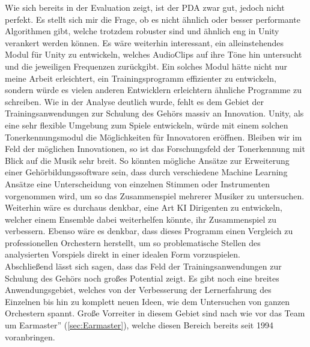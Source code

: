 Wie sich bereits in der Evaluation zeigt, ist der PDA zwar gut, jedoch nicht perfekt. Es stellt sich mir die Frage, ob es nicht ähnlich oder besser performante Algorithmen gibt, welche trotzdem robuster sind und ähnlich eng in Unity verankert werden können. Es wäre weiterhin interessant, ein alleinstehendes Modul für Unity zu entwickeln, welches AudioClips auf ihre Töne hin untersucht und die jeweiligen Frequenzen zurückgibt. Ein solches Modul hätte nicht nur meine Arbeit erleichtert, ein Trainingsprogramm effizienter zu entwickeln, sondern würde es vielen anderen Entwicklern erleichtern ähnliche Programme zu schreiben. Wie in der Analyse deutlich wurde, fehlt es dem Gebiet der Trainingsanwendungen zur Schulung des Gehörs massiv an Innovation. Unity, als eine sehr flexible Umgebung zum Spiele entwickeln, würde mit einem solchen Tonerkennungsmodul die Möglichkeiten für Innovatoren eröffnen. Bleiben wir im Feld der möglichen Innovationen, so ist das Forschungsfeld der Tonerkennung mit Blick auf die Musik sehr breit. So könnten mögliche Ansätze zur Erweiterung einer Gehörbildungssoftware sein, dass durch verschiedene Machine Learning Ansätze eine Unterscheidung von einzelnen Stimmen oder Instrumenten vorgenommen wird, um so das Zusammenspiel mehrerer Musiker zu untersuchen. Weiterhin wäre es durchaus denkbar, eine Art KI Dirigenten zu entwickeln, welcher einem Ensemble dabei weiterhelfen könnte, ihr Zusammenspiel zu verbessern. Ebenso wäre es denkbar, dass dieses Programm einen Vergleich zu professionellen Orchestern herstellt, um so problematische Stellen des analysierten Vorspiels direkt in einer idealen Form vorzuspielen. \\
Abschließend lässt sich sagen, dass das Feld der Trainingsanwendungen zur Schulung des Gehörs noch großes Potential zeigt. Es gibt noch eine breites Anwendungsgebiet, welches von der Verbesserung der Lernerfahrung des Einzelnen bis hin zu komplett neuen Ideen, wie dem Untersuchen von ganzen Orchestern spannt. Große Vorreiter in diesem Gebiet sind nach wie vor das Team um \glqq Earmaster'' (\ref{sec:Earmaster}), welche diesen Bereich bereits seit 1994 voranbringen.




